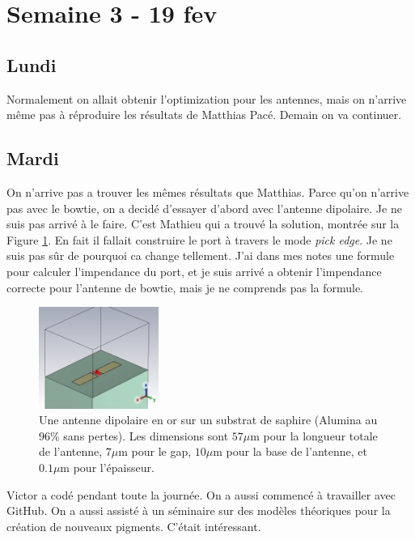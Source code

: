 \section{Semaine 3 - 19 fev}

\subsection{Lundi}

Normalement on allait obtenir l'optimization pour les antennes, mais on n'arrive même pas à
réproduire les résultats de Matthias Pacé. Demain on va continuer.

\subsection{Mardi}

On n'arrive pas a trouver les mêmes résultats que Matthias. Parce qu'on n'arrive pas avec le bowtie, on a
decidé d'essayer d'abord avec l'antenne dipolaire. Je ne suis pas arrivé à le faire. C'est Mathieu qui a 
trouvé la solution, montrée sur la Figure \ref{fig:first_dipole}. En fait il fallait construire le port à 
travers le mode \textit{pick edge}. Je ne suis pas sûr de pourquoi ca change tellement.
J'ai dans mes notes une formule pour calculer l'impendance du port, et je suis arrivé a obtenir l'impendance
correcte pour l'antenne de bowtie, mais je ne comprends pas la formule.

\begin{figure}[h!]
    \centering
    \includegraphics[width=0.35\textwidth]{texfigures/first_dipole.png}
    \caption{\label{fig:first_dipole} Une antenne dipolaire en or sur un substrat de saphire (Alumina au $96\%$ sans pertes). Les dimensions sont $57\mu$m pour la longueur totale de l'antenne, $7\mu$m pour le gap, $10\mu$m pour la base de l'antenne, et $0.1\mu$m pour l'épaisseur.}
\end{figure}


Victor a codé pendant toute la journée. On a aussi commencé à travailler avec GitHub. On a aussi assisté
à un séminaire sur des modèles théoriques pour la création de nouveaux pigments. C'était intéressant.